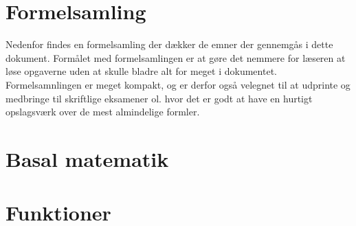 \chapter{Formelsamling}
Nedenfor findes en formelsamling der dækker de emner der gennemgås i dette dokument. Formålet med formelsamlingen er at gøre det nemmere for læseren at løse opgaverne uden at skulle bladre alt for meget i dokumentet. Formelsamnlingen er meget kompakt, og er derfor også velegnet til at udprinte og medbringe til skriftlige eksamener ol. hvor det er godt at have en hurtigt opslagsværk over de mest almindelige formler. 
{ 
    \fontsize{8pt}{0.5pt}\selectfont
    \setlength{\abovedisplayskip}{1pt}
    \setlength{\belowdisplayskip}{1pt}
    \pagestyle{empty}
    \setlength{\parindent}{0pt}
    \small
    \begin{multicols*}{3}
        
        
        
        
        
        
        
    \end{multicols*}
    }
\restoregeometry
{}
\chapter{Basal matematik}


















\chapter{Funktioner}









